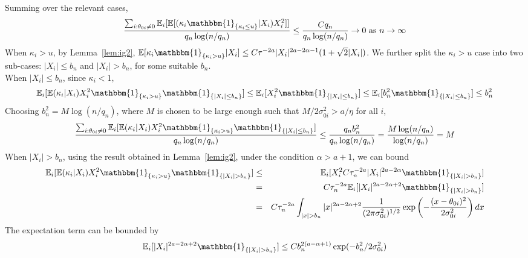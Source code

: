 \documentclass[sn-basic]{sn-jnl}%
\theoremstyle{thmstyleone}%
\begin{document}
\noindent
Summing over the relevant cases,
\begin{equation}
\frac{\sum_{i: \theta_{0i} \neq 0} \mathbb{E}_i[\mathbb{E}[(\kappa_i \mathbbm{1}_{\{ \kappa_i \leq u \}}|X_i)X_i^2]]}{q_n \log (n/q_n)} \leq \frac{C q_n}{q_n \log (n/q_n)} \to 0 \text{ as } n \to \infty
\label{eq:t1-ig-6}
\end{equation}
When $\kappa_i > u$, by Lemma~\ref{lem:ig2}, $\mathbb{E}[\kappa_i \mathbbm{1}_{\{ \kappa_i > u \}}|X_i] \leq C\tau^{-2a} |X_i|^{2a-2\alpha-1} (1+\sqrt{2}|X_i|)$. We further split the $\kappa_i > u$ case into two sub-cases: $|X_i| \leq b_n$ and $|X_i|>b_n$, for some suitable $b_n$.\\

\noindent
When $|X_i| \leq b_n$, since $\kappa_i < 1$,
\begin{equation}
\mathbb{E}_i[\mathbb{E}(\kappa_i|X_i) X_i^2 \mathbbm{1}_{\{ \kappa_i > u \}} \mathbbm{1}_{\{ |X_i| \leq b_n \}}]
\leq \mathbb{E}_i[X_i^2 \mathbbm{1}_{\{ |X_i| \leq b_n \}}]
\leq \mathbb{E}_i[b_n^2 \mathbbm{1}_{\{ |X_i| \leq b_n \}}]
\leq b_n^2
\label{eq:t1-ig-7}
\end{equation}
Choosing $b_n^2 = M \log(n/q_n)$, where $M$ is chosen to be large enough such that $M/2\sigma_{0i}^2 > a/\eta$ for all $i$,
\begin{equation}
\frac{\sum_{i: \theta_{0i} \neq 0} \mathbb{E}_i[\mathbb{E}(\kappa_i|X_i) X_i^2 \mathbbm{1}_{\{ \kappa_i > u \}} \mathbbm{1}_{\{ |X_i| \leq b_n \}}]}{q_n \log (n/q_n)} \leq \frac{q_n b_n^2}{q_n \log (n/q_n)} = \frac{M \log (n/q_n)}{\log (n/q_n)} = M
\label{eq:t1-ig-8}
\end{equation}
\noindent
When $|X_i|>b_n$, using the result obtained in Lemma~\ref{lem:ig2}, under the condition $\alpha >a+1$, we can bound
\begin{eqnarray}
\mathbb{E}_i[\mathbb{E}(\kappa_i|X_i) X_i^2 \mathbbm{1}_{\{ \kappa_i > u \}} \mathbbm{1}_{\{ |X_i| > b_n \}}]
&\leq&
\mathbb{E}_i[X_i^2 C\tau_n^{-2a} |X_i|^{2a-2\alpha} \mathbbm{1}_{\{ |X_i| > b_n \}}] \nonumber \\
&=&
C\tau_n^{-2a} \mathbb{E}_i[|X_i|^{2a-2\alpha+2} \mathbbm{1}_{\{ |X_i| > b_n \}}] \nonumber \\
&=&
C\tau_n^{-2a} \int_{|x|>b_n} |x|^{2a-2\alpha+2} \frac{1}{(2\pi \sigma_{0i}^2)^{1/2}} \exp \left( -\frac{(x-\theta_{0i})^2}{2\sigma_{0i}^2} \right) dx \nonumber \\
\label{eq:t1-ig-9}
\end{eqnarray}
\noindent
The expectation term can be bounded by
\begin{equation}
\mathbb{E}_i[|X_i|^{2a-2\alpha+2} \mathbbm{1}_{\{ |X_i| > b_n \}}]
\leq C b_n^{2(a-\alpha+1)} \exp (-b_n^2/2 \sigma_{0i}^2)
\label{eq:t1-ig-10}
\end{equation}
\end{document}
